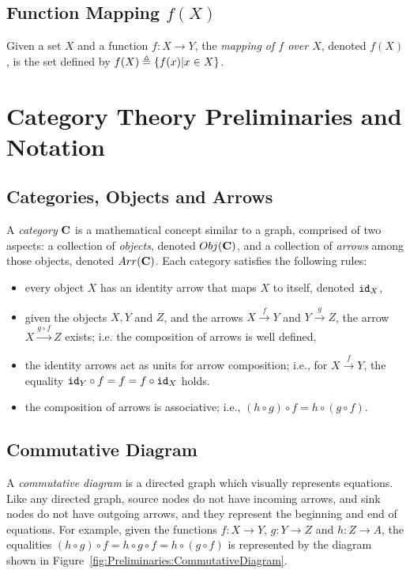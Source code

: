 \subsection{Function Mapping \texorpdfstring{$f(X)$}{f(X)}}
Given a set $X$ and a function $f\colon X\rightarrow Y$, the \emph{mapping of $f$ over $X$}, denoted $f(X)$, is the set defined by $f(X)\triangleq\left\{f(x)| x\in X\right\}$.

\section{Category Theory Preliminaries and Notation}

\subsection{Categories, Objects and Arrows}
A \emph{category} $\AsCategory{C}$ is a mathematical concept similar to a graph, comprised of two aspects: a collection of \emph{objects}, denoted $Obj(\AsCategory{C})$, and a collection of \emph{arrows} among those objects, denoted $Arr(\AsCategory{C})$. Each category satisfies the following  rules:
\begin{itemize}
    \item every object $X$ has an identity arrow that maps $X$ to itself, denoted ${\texttt{id}}_X$,
    \item given the objects $X, Y$ and $Z$, and the arrows $X\xrightarrow{f}Y$ and $Y\xrightarrow{g}Z$, the arrow $X\xrightarrow{g\circ f}Z$ exists; i.e. the composition of arrows is well defined,
    \item the identity arrows act as units for arrow composition; i.e., for $X\xrightarrow{f}Y$, the equality ${\texttt{id}}_{Y}\circ f=f=f\circ {\texttt{id}}_{X}$ holds.
    \item the composition of arrows is associative; i.e., $(h\circ g)\circ f = h \circ (g\circ f)$.
\end{itemize}

\subsection{Commutative Diagram}
A \emph{commutative diagram} is a directed graph which visually represents equations. Like any directed graph, source nodes do not have incoming arrows, and sink nodes do not have outgoing arrows, and they represent the beginning and end of equations. For example, given the functions $f\colon X\rightarrow Y$, $g\colon Y\rightarrow Z$ and $h\colon Z\rightarrow A$, the equalities $(h\circ g)\circ f= h\circ g \circ f= h \circ (g\circ f)$ is represented by the diagram shown in Figure~\ref{fig:Preliminaries:CommutativeDiagram}.

